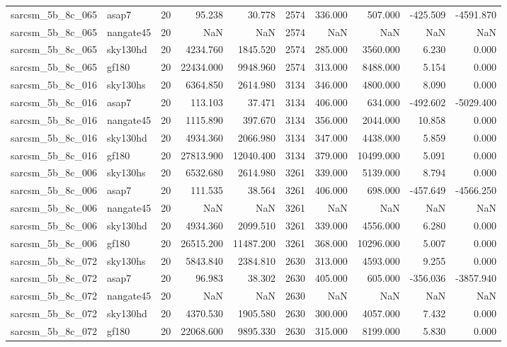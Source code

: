 \begin{tabular}{llrrrrrrrr}
sarcsm\_5b\_8c\_065 & asap7 & 20 & 95.238 & 30.778 & 2574 & 336.000 & 507.000 & -425.509 & -4591.870 \\
sarcsm\_5b\_8c\_065 & nangate45 & 20 & NaN & NaN & 2574 & NaN & NaN & NaN & NaN \\
sarcsm\_5b\_8c\_065 & sky130hd & 20 & 4234.760 & 1845.520 & 2574 & 285.000 & 3560.000 & 6.230 & 0.000 \\
sarcsm\_5b\_8c\_065 & gf180 & 20 & 22434.000 & 9948.960 & 2574 & 313.000 & 8488.000 & 5.154 & 0.000 \\
sarcsm\_5b\_8c\_016 & sky130hs & 20 & 6364.850 & 2614.980 & 3134 & 346.000 & 4800.000 & 8.090 & 0.000 \\
sarcsm\_5b\_8c\_016 & asap7 & 20 & 113.103 & 37.471 & 3134 & 406.000 & 634.000 & -492.602 & -5029.400 \\
sarcsm\_5b\_8c\_016 & nangate45 & 20 & 1115.890 & 397.670 & 3134 & 356.000 & 2044.000 & 10.858 & 0.000 \\
sarcsm\_5b\_8c\_016 & sky130hd & 20 & 4934.360 & 2066.980 & 3134 & 347.000 & 4438.000 & 5.859 & 0.000 \\
sarcsm\_5b\_8c\_016 & gf180 & 20 & 27813.900 & 12040.400 & 3134 & 379.000 & 10499.000 & 5.091 & 0.000 \\
sarcsm\_5b\_8c\_006 & sky130hs & 20 & 6532.680 & 2614.980 & 3261 & 339.000 & 5139.000 & 8.794 & 0.000 \\
sarcsm\_5b\_8c\_006 & asap7 & 20 & 111.535 & 38.564 & 3261 & 406.000 & 698.000 & -457.649 & -4566.250 \\
sarcsm\_5b\_8c\_006 & nangate45 & 20 & NaN & NaN & 3261 & NaN & NaN & NaN & NaN \\
sarcsm\_5b\_8c\_006 & sky130hd & 20 & 4934.360 & 2099.510 & 3261 & 339.000 & 4556.000 & 6.280 & 0.000 \\
sarcsm\_5b\_8c\_006 & gf180 & 20 & 26515.200 & 11487.200 & 3261 & 368.000 & 10296.000 & 5.007 & 0.000 \\
sarcsm\_5b\_8c\_072 & sky130hs & 20 & 5843.840 & 2384.810 & 2630 & 313.000 & 4593.000 & 9.255 & 0.000 \\
sarcsm\_5b\_8c\_072 & asap7 & 20 & 96.983 & 38.302 & 2630 & 405.000 & 605.000 & -356.036 & -3857.940 \\
sarcsm\_5b\_8c\_072 & nangate45 & 20 & NaN & NaN & 2630 & NaN & NaN & NaN & NaN \\
sarcsm\_5b\_8c\_072 & sky130hd & 20 & 4370.530 & 1905.580 & 2630 & 300.000 & 4057.000 & 7.432 & 0.000 \\
sarcsm\_5b\_8c\_072 & gf180 & 20 & 22068.600 & 9895.330 & 2630 & 315.000 & 8199.000 & 5.830 & 0.000 \\

\end{tabular}

